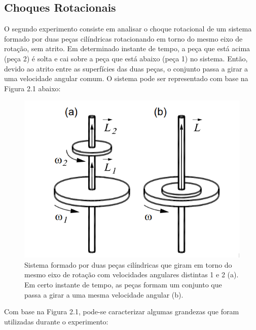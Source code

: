 
\subsection{Choques Rotacionais}

O segundo experimento consiste em analisar o choque rotacional de um sistema formado por duas peças cilíndricas rotacionando em torno do mesmo eixo de rotação, sem atrito. Em determinado instante de tempo, a peça que está acima (peça 2) é solta e cai sobre a peça que está abaixo (peça 1) no sistema. Então, devido ao atrito entre as superfícies das duas peças, o conjunto passa a girar a uma velocidade angular comum. O sistema pode ser representado com base na Figura 2.1 abaixo:

\begin{figure}[H]
  \centering
  \includegraphics[scale=0.8]{images/choque_rotacional.png}
  \caption{Sistema formado por duas peças cilíndricas que giram em torno do mesmo eixo de rotação com velocidades angulares distintas 1 e 2 (a). Em certo instante de tempo, as peças formam um conjunto que passa a girar a uma mesma velocidade angular (b).}
\end{figure}

Com base na Figura 2.1, pode-se caracterizar algumas grandezas que foram utilizadas durante o experimento:

